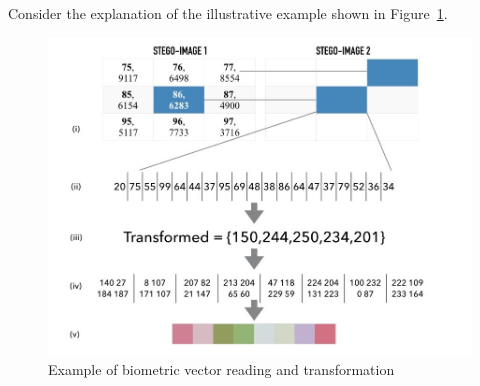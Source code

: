 Consider the explanation of the illustrative example shown in Figure~\ref{fig:Example of biometric vector reading and transformation}.

    
    \begin{figure}[htbp!] 
    \centering    
    \includegraphics[width=1.0\textwidth]{Chapter3/Figs/Figure3-6.png}
    \caption[Example of biometric vector reading and transformation]{Example of biometric vector reading and transformation}
    \label{fig:Example of biometric vector reading and transformation}
    \end{figure}

